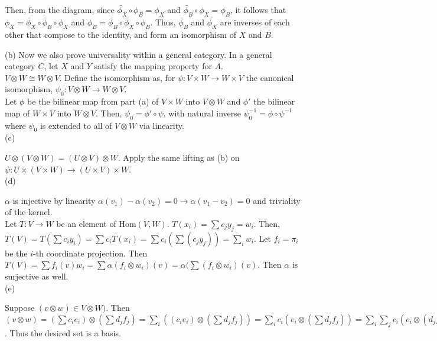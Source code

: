 \documentclass[paper=a4, fontsize=11pt]{scrartcl} %
\numberwithin{equation}{section} %
\numberwithin{figure}{section} %
\numberwithin{table}{section} %
\begin{document}
Then, from the diagram, since $\widetilde{\phi_X} \circ \phi_B =\phi_X$ and $\widetilde{\phi_B} \circ \phi_X = \phi_B$,
it follows that $\phi_X = \widetilde{\phi_X} \circ \widetilde{\phi_B} \circ \phi_X$
and $\phi_B = \widetilde{\phi_B} \circ \widetilde{\phi_X} \circ \phi_B$.
Thus, $\widetilde{\phi_B}$ and $\widetilde{\phi_X}$ are inverses of each other that compose to the identity,
and form an isomorphism of $X$ and $B$.

(b)
Now we also prove universality within a general category. In a general category $C$, let $X$ and $Y$ satisfy the mapping property for $A$. \\

$V \otimes W \cong W \otimes V$. Define the isomorphism as, for $\psi: V \times W \to W \times V$ the canonical isomorphism, $\psi_0: V \otimes W \to W \otimes V$. \\


Let $\phi$ be the bilinear map from part (a) of $V \times W$ into $V \otimes W$ and $\phi'$ the bilinear map of $W \times V$ into $W \otimes V$. 
Then, $ \psi_0 = \phi' \circ \psi$, with natural inverse $\psi_0 ^{-1} = \phi \circ \psi^{-1}$ 
where $\psi_0$ is extended to all of $V \otimes W$ via linearity. \\

(c)

$U \otimes (V \otimes W) = (U \otimes V) \otimes W$. Apply the same lifting as (b) on $\psi: U \times (V \times W) \to (U \times V) \times W$.\\

(d)

$\alpha$ is injective by linearity $\alpha(v_1) - \alpha(v_2) = 0 \to \alpha(v_1 - v_2) = 0$ and triviality of the kernel. \\

Let $T: V \to W$ be an element of Hom$(V,W)$. $T(x_i) = \sum c_j y_j = w_i$. 
Then, $T(V) = T(\sum c_i y_i) = \sum c_i T(x_i)  = \sum c_i (\sum(c_j y_j))  = \sum_i w_i $. Let $f_i =  \pi_i$ be the $i$-th coordinate projection. 
Then $T(V) = \sum f_i(v) w_i = \sum\alpha(f_i \otimes w_i)(v) = \alpha(\sum(f_i \otimes w_i)(v).$ Then $\alpha$ is surjective as well. \\

(e)

Suppose $(v \otimes w) \in V \otimes W)$.
Then $(v \otimes w) = (\sum c_i e_i) \otimes (\sum d_j f_j) = \sum_i((c_i e_i) \otimes (\sum d_j f_j)) =  \sum_ic_i (e_i \otimes (\sum d_j f_j)) =  \sum_i \sum_j c_i (e_i \otimes (d_j f_j)) = \sum_i \sum_j c_i d_j (e_i \otimes f_j)$. 
Thus the desired set is a basis.
\end{document}
